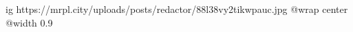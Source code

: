  
 
 
 
 

\ifcmt
  ig https://mrpl.city/uploads/posts/redactor/88l38vy2tikwpauc.jpg
  @wrap center
  @width 0.9
\fi
